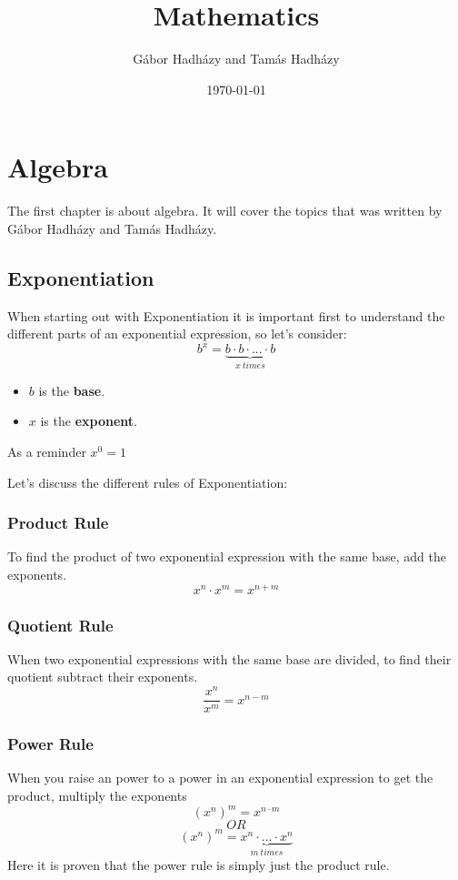 \documentclass[a4paper,12pt]{book}
\author{Gábor Hadházy and Tamás Hadházy}
\title{Mathematics}
\date{\today}
\begin{document}
\maketitle

\tableofcontents

\chapter{Algebra}
The first chapter is about algebra. It will cover the topics that was written by Gábor Hadházy and Tamás Hadházy.
\section{Exponentiation}
When starting out with Exponentiation it is important first to understand the different parts of an exponential expression, so let's consider:
$$b^x = \underbrace{b \cdot b \cdot ... \cdot b}_{x \ times}$$
\begin{itemize}
  \item $b$ is the \textbf{base}.
  \item $x$ is the \textbf{exponent}.
\end{itemize}

As a reminder $ x^0 = 1 $

Let's discuss the different rules of Exponentiation:
\subsection{Product Rule}
To find the product of two exponential expression with the same base, add the exponents. 
$$ x^{n} \cdot x^{m} = x^{n+m} $$

\subsection{Quotient Rule}
When two exponential expressions with the same base are divided,  to find their quotient subtract their exponents. 
$$ \frac{x^n}{x^m} = x^{n-m} $$

\subsection{Power Rule}
When you raise an power to a power in an exponential expression to get the product, multiply the exponents
$$ (x^{n})^{m} = x^{n \cdot m} $$ 
$$ OR $$
$$ (x^{n})^{m} = \underbrace{x^n \cdot ... \cdot x^n}_{m \ times} $$
Here it is proven that the power rule is simply just the product rule.
\end{document}
